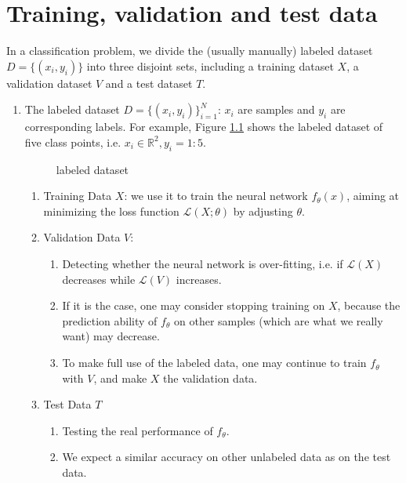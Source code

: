 \chapter{Training, validation and test data}
In a classification problem, we divide the (usually manually) labeled dataset $D=\{(x_i,y_i)\}$ into three disjoint sets, including a training dataset $X$, a validation dataset $V$ and a test dataset $T$.

	\begin{enumerate}
		\item The labeled dataset $D=\{(x_i,y_i)\}_{i=1}^N$: $x_i$ are samples and $y_i$ are corresponding labels. For example, Figure \ref{xd:lbd} shows the labeled dataset of five class points, i.e. $x_i\in\mathbb{R}^2,y_i=1:5$.
		
			\begin{figure}[!ht] 
				\caption{labeled dataset} 
				\label{xd:lbd}
			\end{figure}
			 
		\begin{enumerate}
			\item Training Data $X$: we use it to train the neural network $f_\theta(x)$, aiming at minimizing the loss function $\mathcal{L}(X;\theta)$ by adjusting $\theta$.
			
			\item Validation Data $V$: 
			\begin{enumerate}
				\item Detecting whether the neural network is over-fitting, i.e. if $\mathcal{L}(X)$ decreases while $\mathcal{L}(V)$ increases.
				\item If it is the case, one may consider stopping training on $X$, because the prediction ability of $f_\theta$ on other samples (which are what we really want) may decrease.
				\item To make full use of the labeled data, one may continue to train $f_\theta$ with $V$, and make $X$ the validation data.
			\end{enumerate}
			\item Test Data $T$
			\begin{enumerate}
				\item Testing the real performance of $f_\theta$.
				\item We expect a similar accuracy on other unlabeled data as on the test data.
			\end{enumerate}
		\end{enumerate}
		

\end{enumerate}
